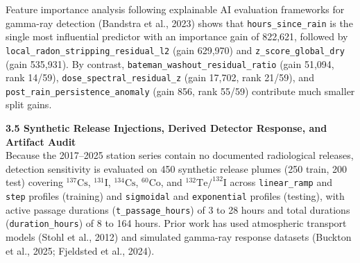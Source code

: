 \documentclass[11pt,a4paper]{article}
\begin{document}
\begin{framed}
\begin{enumerate}
\end{enumerate}

Feature importance analysis following explainable AI evaluation frameworks for gamma-ray detection (Bandstra et al., 2023) shows that \texttt{hours\_since\_rain} is the single most influential predictor with an importance gain of 822,621, followed by \texttt{local\_radon\_stripping\_residual\_l2} (gain 629,970) and \texttt{z\_score\_global\_dry} (gain 535,931). By contrast, \texttt{bateman\_washout\_residual\_ratio} (gain 51,094, rank 14/59), \texttt{dose\_spectral\_residual\_z} (gain 17,702, rank 21/59), and \texttt{post\_rain\_persistence\_anomaly} (gain 856, rank 55/59) contribute much smaller split gains.

\vspace{0.6em}
\noindent\textbf{3.5 Synthetic Release Injections, Derived Detector Response, and Artifact Audit}\\[0.3em]
Because the 2017--2025 station series contain no documented radiological releases, detection sensitivity is evaluated on 450 synthetic release plumes (250 train, 200 test) covering $^{137}\text{Cs}$, $^{131}\text{I}$, $^{134}\text{Cs}$, $^{60}\text{Co}$, and $^{132}\text{Te}/^{132}\text{I}$ across \texttt{linear\_ramp} and \texttt{step} profiles (training) and \texttt{sigmoidal} and \texttt{exponential} profiles (testing), with active passage durations (\texttt{t\_passage\_hours}) of 3 to 28 hours and total durations (\texttt{duration\_hours}) of 8 to 164 hours. Prior work has used atmospheric transport models (Stohl et al., 2012) and simulated gamma-ray response datasets (Buckton et al., 2025; Fjeldsted et al., 2024).


\end{framed}
\end{document}
